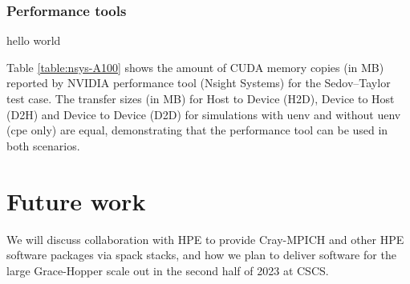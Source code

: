 \subsubsection{Performance tools}

\begin{table}[htp!]
    \centering
    \caption{hello world}
    \label{table:nsys-A100}
\end{table}

Table \ref{table:nsys-A100} shows the amount of CUDA memory copies (in MB) reported by NVIDIA performance tool (Nsight Systems) for the Sedov--Taylor test case.
The transfer sizes (in MB) for Host to Device (H2D), Device to Host (D2H) and Device to Device (D2D) for simulations with uenv and without uenv (cpe only) are equal, demonstrating that the performance tool can be used in both scenarios.

\section{Future work}

We will discuss collaboration with HPE to provide Cray-MPICH and other HPE software packages via spack stacks, and how we plan to deliver software for the large Grace-Hopper scale out in the second half of 2023 at CSCS.

